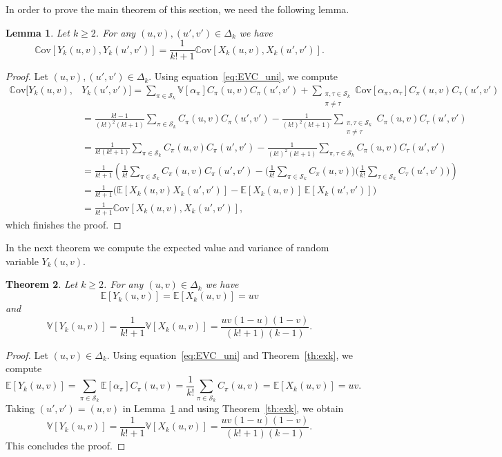 \documentclass[12pt,a4paper]{amsart}
\newtheorem{theorem}{Theorem}[section]
\newtheorem{lemma}[theorem]{Lemma}
\theoremstyle{definition}
\newcommand{\DK}{\Delta_k}
\newcommand{\SK}{\mathcal{S}_k}
\newcommand{\EE}{\mathbb{E}}
\newcommand{\VV}{\mathbb{V}}
\newcommand{\Cov}{\mathbb{C}\mathrm{ov}}
\begin{document}
In order to prove the main theorem of this section, we need the following lemma.
\begin{lemma} \label{lem:cov_YY}
    Let $k \geq 2$. For any $(u,v), (u',v')\in \DK$ we have 
    $$\Cov[Y_k(u,v),Y_k(u',v')] =\frac{1}{k!+1}\Cov[X_k(u,v),X_k(u',v')].$$
\end{lemma}

\begin{proof}
Let $(u,v), (u',v')\in \DK$. Using equation~\eqref{eq:EVC_uni}, we compute
    \begin{align*}
    \Cov[Y_k(u,v),&Y_k(u',v')] =\sum_{\pi \in \SK} \VV[\alpha_\pi] C_{\pi}(u,v)C_{\pi}(u',v')+\sum_{\substack{\pi,\tau \in \SK\\ \pi \ne \tau}} \Cov[\alpha_\pi,\alpha_\tau] C_{\pi}(u,v)C_{\tau}(u',v') \\
    &=\frac{k!-1}{(k!)^2(k!+1)} \sum_{\pi \in \SK} C_{\pi}(u,v)C_{\pi}(u',v')-\frac{1}{(k!)^2(k!+1)} \sum_{\substack{\pi,\tau \in \SK\\ \pi \ne \tau}} C_{\pi}(u,v)C_{\tau}(u',v') \\
    &=\frac{1}{k!(k!+1)} \sum_{\pi \in \SK} C_{\pi}(u,v)C_{\pi}(u',v')-\frac{1}{(k!)^2(k!+1)} \sum_{\pi,\tau \in \SK} C_{\pi}(u,v)C_{\tau}(u',v') \\
    &=\frac{1}{k!+1}\left(\frac{1}{k!}\sum_{\pi \in \SK} C_{\pi}(u,v)C_{\pi}(u',v')-\Big(\frac{1}{k!}\sum_{\pi \in \SK} C_{\pi}(u,v)\Big)\Big(\frac{1}{k!}\sum_{\tau \in \SK} C_{\tau}(u',v')\Big)\right) \\
    &=\frac{1}{k!+1}\big(\EE[X_k(u,v)X_k(u',v')]-\EE[X_k(u,v)]\, \EE[X_k(u',v')]\big) \\
    &=\frac{1}{k!+1}\Cov[X_k(u,v),X_k(u',v')],
\end{align*}
which finishes the proof.
\end{proof}


In the next theorem we compute the expected value and variance of random variable $Y_k(u,v)$.
\begin{theorem} \label{th:eyk}
    Let $k\ge 2$. For any $(u,v) \in \DK$ we have 
    $$\EE[Y_k(u,v)] =\EE[X_k(u,v)]= uv$$
    and
    $$\VV[Y_k(u,v)] =\frac{1}{k!+1}\VV[X_k(u,v)] = \frac{uv(1-u)(1-v)}{(k!+1)(k-1)}.$$
\end{theorem}

\begin{proof}
Let $(u,v) \in \DK$. Using equation~\eqref{eq:EVC_uni} and Theorem~\ref{th:exk}, we compute
$$\EE[Y_k(u,v)]= \sum_{\pi \in \SK} \EE[\alpha_\pi] C_{\pi}(u,v) = \frac{1}{k!} \sum_{\pi \in \SK} C_{\pi}(u,v) = \EE[X_k(u,v)] = uv.$$
Taking $(u',v')=(u,v)$ in Lemma~\ref{lem:cov_YY} and using Theorem~\ref{th:exk}, we obtain
$$\VV[Y_k(u,v)]=\frac{1}{k!+1}\VV[X_k(u,v)]=\frac{uv(1-u)(1-v)}{(k!+1)(k-1)}.$$
This concludes the proof.
\end{proof}
\end{document}
